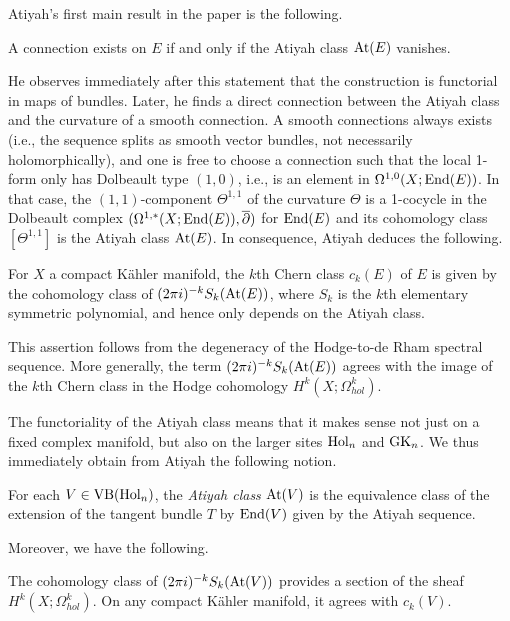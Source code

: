 \documentclass[10pt]{amsart}
\begin{document}
Atiyah's first main result in the paper is the following.

\begin{prop}
A connection exists on $E$ if and only if the Atiyah class ${\rm At}(E)$ vanishes.
\end{prop}

He observes immediately after this statement that the construction is
functorial in maps of bundles. Later, he finds a direct connection
between the Atiyah class and the curvature of a smooth connection. A
smooth connections always exists (i.e., the sequence splits as smooth
vector bundles, not necessarily holomorphically), and one is free to
choose a connection such that the local 1-form only has
Dolbeault type $(1,0)$, i.e., is an element in $\Omega^{1,0}(X; {\rm End}(E))$. In that case, the $(1,1)$-component
$\Theta^{1,1}$ of the curvature $\Theta$ is a 1-cocycle in the
Dolbeault complex $(\Omega^{1,*}(X ; {\rm End}(E)), \overline{\partial})$ for ${\rm End}(E)$ and its cohomology class $[\Theta^{1,1}]$ is the Atiyah class ${\rm At}(E)$. In consequence, Atiyah deduces the following.

\begin{prop}
For $X$ a compact K\"ahler manifold, the $k$th Chern class $c_k(E)$ of $E$ is given by the cohomology class of $(2\pi i)^{-k} S_k({\rm At}(E))$, 
where $S_k$ is the $k$th elementary symmetric polynomial, and hence only depends on the Atiyah class.
\end{prop}

This assertion follows from the degeneracy of the Hodge-to-de Rham
spectral sequence. More generally, the term $(2\pi i)^{-k}
S_k({\rm At}(E))$ agrees with the image of the $k$th Chern class in the
Hodge cohomology $H^k(X ; \Omega^k_{hol})$.

The functoriality of the Atiyah class means that it makes sense not just on a fixed complex manifold, but also on the larger sites ${\rm Hol}_n$ and ${\rm GK}_n$. 
We thus immediately obtain from Atiyah the following notion.

\begin{dfn}
For each $V \in {\rm VB}({\rm Hol}_n)$, the {\em Atiyah class} ${\rm At}(V)$ is the equivalence class of the extension of the tangent bundle $T$ by ${\rm End}(V)$ given by the Atiyah sequence.
\end{dfn}

Moreover, we have the following.

\begin{lem}
The cohomology class of $(2\pi i)^{-k} S_k({\rm At}(V))$ provides a section
of the sheaf $H^k(X ; \Omega^k_{hol})$. On any compact K\"ahler manifold, it agrees with $c_k(V)$.
\end{lem}
\end{document}
